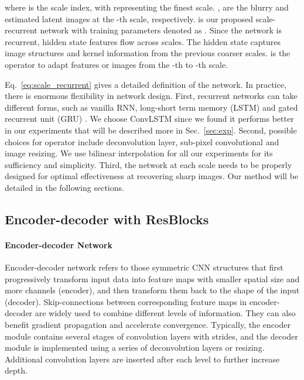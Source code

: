 \documentclass[10pt,twocolumn,letterpaper]{article}
\begin{document}
where  is the scale index, with  representing the finest scale. ,  are the blurry and estimated latent images at the -th scale,
respectively.  is our proposed scale-recurrent network with training parameters denoted as . Since the network is recurrent, hidden state features  flow across scales. The hidden state captures image structures and kernel information from the previous coarser scales.  is the operator to adapt features or images from the -th to -th scale.

Eq.~\eqref{eq:scale_recurrent} gives a detailed definition of the network. In practice, there is enormous flexibility in network design. First, recurrent networks can take different forms, such as vanilla RNN, long-short term memory (LSTM) \cite{hochreiter1997long,xingjian2015convolutional} and gated recurrent unit (GRU) \cite{chung2014empirical}. We choose ConvLSTM \cite{xingjian2015convolutional} since we found it performs better in our experiments that will be described more in Sec.~\ref{sec:exp}. Second, possible choices for operator  include deconvolution layer, sub-pixel convolutional \cite{shi2016real} and image resizing. We use bilinear interpolation for all our experiments for its sufficiency and simplicity. Third, the network at each scale needs to be properly designed for optimal effectiveness at recovering sharp images. Our method will be detailed in the following sections.



\subsection{Encoder-decoder with ResBlocks}
\paragraph{Encoder-decoder Network} Encoder-decoder network \cite{mao2016image,ronneberger2015u} refers to those symmetric CNN structures that first progressively transform input data into feature maps with smaller spatial size and more channels (encoder), and then transform them back to the shape of the input (decoder). Skip-connections between corresponding feature maps in encoder-decoder are widely used to combine different levels of information. They can also benefit gradient propagation and accelerate convergence. Typically, the encoder module contains several stages of convolution layers with strides, and the decoder module is implemented using a series of deconvolution layers \cite{liu2017video,su2017deep,tao2017spmc} or resizing. Additional convolution layers are inserted after each level to further increase depth.
\end{document}
